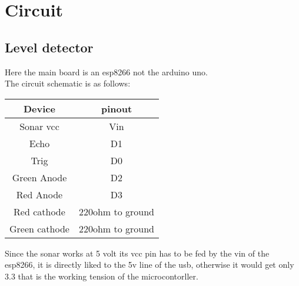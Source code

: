 \section{Circuit}
\subsection{Level detector}
Here the main board is an esp8266 not the arduino uno.\\
The circuit schematic is as follows:\\
\begin{center}
    \begin{tabular}{|c|c|}
        \hline
        Device             & pinout \\
        \hline
        \hline
        Sonar vcc & Vin     \\
        \hline
        Echo                & D1      \\
        \hline
        Trig                 & D0      \\
        \hline
        Green Anode                 & D2      \\
        \hline
        Red Anode                 & D3      \\
        \hline
        Red cathode              & 220ohm to ground      \\
        \hline
        Green cathode              & 220ohm to ground     \\
        \hline
    \end{tabular}
\end{center}
Since the sonar works at 5 volt its vcc pin has to be fed by the vin of the esp8266, it is directly liked to the 5v line of the usb, otherwise it would get only 3.3 that is the working tension of the microcontorller.
\pagebreak

